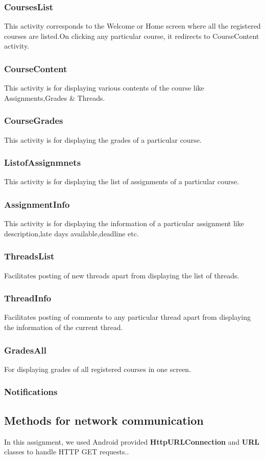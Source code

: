 \documentclass[12pt]{article}
\begin{document}
\subsubsection{CoursesList}
This activity corresponds to the Welcome or Home screen where all the registered courses are listed.On clicking any particular course, it redirects to CourseContent activity.
\subsubsection{CourseContent}
This activity is for displaying  various contents of the course like Assignments,Grades \& Threads.
\subsubsection{CourseGrades}
This activity is for displaying the grades of a particular course.
\subsubsection{ListofAssignmnets}
This activity is for displaying the list of assignments of a particular course.
\subsubsection{AssignmentInfo}
This activity is for displaying the information of a particular assignment like description,late days available,deadline etc.
\subsubsection{ThreadsList}
Facilitates posting of new threads apart from displaying the list of threads.
\subsubsection{ThreadInfo}
Facilitates posting of comments to any particular thread apart from displaying the information of the current thread.
\subsubsection{GradesAll}
For displaying grades of all registered courses in one screen.
\subsubsection{Notifications}

\subsection{Methods for network communication}
In this assignment, we used Android provided \textbf{HttpURLConnection} and \textbf{URL}					
classes to handle HTTP GET requests.\cite{Volley}.
\end{document}
